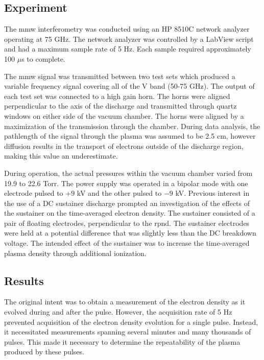 \subsection{Experiment}

The \acs{mmw} interferometry was conducted using an HP 8510C network analyzer
operating at 75 GHz. The network analyzer was controlled by a LabView script and
had a maximum sample rate of 5 Hz. Each sample required approximately 100 $\mu$s
to complete.

The \acs{mmw} signal was transmitted between two test sets which produced a
variable frequency signal covering all of the V band (50-75 GHz). The output of
each test set was connected to a high gain horn. The horns were aligned
perpendicular to the axis of the discharge and transmitted through quartz
windows on either side of the vacuum chamber. The horns were aligned by a
maximization of the transmission through the chamber. During data analysis, the
pathlength of the signal through the plasma was assumed to be 2.5 cm, however
diffusion results in the transport of electrons outside of the discharge region,
making this value an underestimate.

During operation, the actual pressures within the vacuum chamber varied from
19.9 to 22.6 Torr. The power supply was operated in a bipolar mode with one
electrode pulsed to $+9$ kV and the other pulsed to $-9$ kV. Previous interest
in the use of a DC sustainer discharge \cite{Schneider2009a} prompted an
investigation of the effects of the sustainer on the time-averaged electron
density. The sustainer consisted of a pair of floating electrodes, perpendicular
to the \acs{rpnd}. The sustainer electrodes were held at a potential difference
that was slightly less than the DC breakdown voltage. The intended effect of the
sustainer was to increase the time-averaged plasma density through additional
ionization.

\subsection{Results}

The original intent was to obtain a measurement of the electron density as it
evolved during and after the pulse. However, the acquisition rate of 5 Hz
prevented acquisition of the electron density evolution for a single pulse.
Instead, it necessitated measurements spanning several minutes and many
thousands of pulses. This made it necessary to determine the repeatability of
the plasma produced by these pulses.

